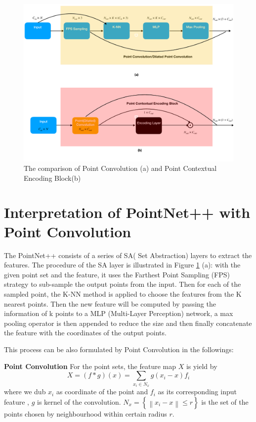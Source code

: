 \documentclass[runningheads]{llncs}
\begin{document}
\begin{figure}[t]
			\begin{minipage}{1\textwidth}
				\centering				\includegraphics[width=1.0\linewidth]{eccv2020kit/Figure/SA_layer.pdf}
			\end{minipage}
    \caption{The comparison of Point Convolution (a) and Point Contextual Encoding Block(b)}
    \label{fig:PointConv}
\end{figure}

\section{Interpretation of PointNet++ with Point Convolution}

The PointNet++ \cite{pointnet++} consists of a series of SA( Set Abstraction) layers to extract the features. The procedure of the SA layer is illustrated in Figure \ref{fig:PointConv} (a): with the given point set and the feature, it uses the Farthest Point Sampling (FPS) strategy to sub-sample the output points from the input. %
Then for each of  the sampled point, the K-NN method is applied to choose the features from the K nearest points. Then the new feature will be computed by passing the information of k points  to a MLP (Multi-Layer Perception) network, a max pooling operator is then appended to reduce the size and then finally concatenate the feature with the coordinates of the output points.

This process can be also formulated by Point Convolution in the followings:

\noindent \textbf{Point Convolution} 
For the point sets, the feature map $X$ is yield by  
\begin{equation} 
X= (f*g)(x)= \sum_{x_{i}\in N_{x}} g(x_{i}-x)f_{i} \label{equation:PointConv}
\end{equation}
where we dub $x_{i}$ as coordinate of the point and $f_{i}$ as its corresponding input feature ,  $g$ is kernel of the convolution.  $N_{x} = \left\{  \left\|x_{i}-x  \right\| \leq r \right\}$ is the set of the points chosen by neighbourhood within certain radius $r$.
\end{document}
